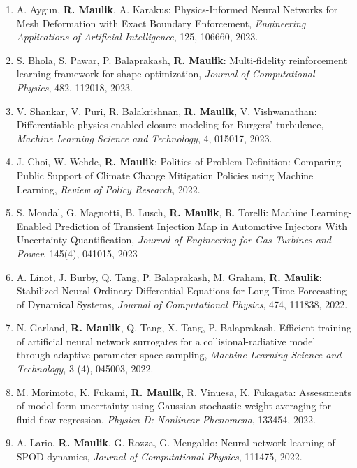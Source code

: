 \documentclass[letterpaper]{article}
\begin{document}
\begin{enumerate}
\item A. Aygun, \textbf{R. Maulik}, A. Karakus: Physics-Informed Neural Networks for Mesh Deformation with Exact Boundary Enforcement, {\it Engineering Applications of Artificial Intelligence}, 125, 106660, 2023.

\item S. Bhola, S. Pawar, P. Balaprakash, \textbf{R. Maulik}: Multi-fidelity reinforcement learning framework for shape optimization, {\it Journal of Computational Physics}, 482, 112018, 2023.

\item V. Shankar, V. Puri, R. Balakrishnan, \textbf{R. Maulik}, V. Vishwanathan: Differentiable physics-enabled closure modeling for Burgers' turbulence, {\it Machine Learning Science and Technology}, 4, 015017, 2023.

\item J. Choi, W. Wehde, \textbf{R. Maulik}: Politics of Problem Definition: Comparing Public Support of Climate Change Mitigation Policies using Machine Learning, {\it Review of Policy Research}, 2022.

\item S. Mondal, G. Magnotti, B. Lusch, \textbf{R. Maulik}, R. Torelli: Machine Learning-Enabled Prediction of Transient Injection Map in Automotive Injectors With Uncertainty Quantification, {\it Journal of Engineering for Gas Turbines and Power}, 145(4), 041015, 2023

\item A. Linot, J. Burby, Q. Tang, P. Balaprakash, M. Graham, \textbf{R. Maulik}: Stabilized Neural Ordinary Differential Equations for Long-Time Forecasting of Dynamical Systems, {\it Journal of Computational Physics}, 474, 111838, 2022.

\item N. Garland, \textbf{R. Maulik}, Q. Tang, X. Tang, P. Balaprakash, Efficient training of artificial neural network surrogates for a collisional-radiative model through adaptive parameter space sampling, {\it Machine Learning Science and Technology}, 3 (4), 045003, 2022.

\item M. Morimoto, K. Fukami, \textbf{R. Maulik}, R. Vinuesa, K. Fukagata: Assessments of model-form uncertainty using Gaussian stochastic weight averaging for fluid-flow regression, {\it Physica D: Nonlinear Phenomena}, 133454, 2022.

\item A. Lario, \textbf{R. Maulik}, G. Rozza, G. Mengaldo: Neural-network learning of SPOD dynamics, {\it Journal of Computational Physics}, 111475, 2022.


\end{enumerate}
\end{document}
